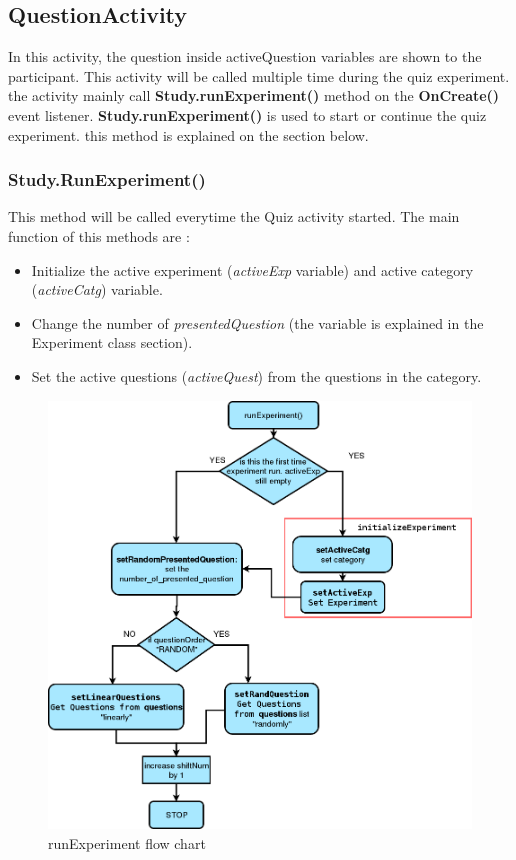 \subsection{QuestionActivity}

In this activity, the question inside activeQuestion variables are shown to the participant.
This activity will be called multiple time during the quiz experiment.
the activity mainly call \textbf{Study.runExperiment()} method on the \textbf{OnCreate()} event listener.
\textbf{Study.runExperiment()} is used to start or continue the quiz experiment. this method is explained on the section below.

\subsubsection{Study.RunExperiment()}
This method will be called everytime the Quiz activity started.
The main function of this methods are :
\begin{itemize}
\item Initialize the active experiment (\textit{activeExp} variable) and active category (\textit{activeCatg}) variable.
\item Change the number of \textit{presentedQuestion} (the variable is explained in the Experiment class section).
\item Set the active questions (\textit{activeQuest}) from the questions in the category.
\end{itemize}


\begin{figure}
\begin{center}
\includegraphics[scale=0.5]{runExperiment}
\end{center}
\caption{runExperiment flow chart}
\label{fig:runExperiment_flow}
\end{figure}


